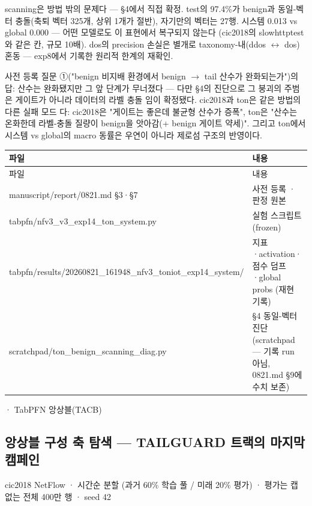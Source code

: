scanning은 방법 밖의 문제다 — §4에서 직접 확정. test의 97.4\%가 benign과 동일-벡터 충돌(축퇴 벡터 325개, 상위 1개가 절반), 자기만의 벡터는 27행. 시스템 0.013 vs global 0.000 — 어떤 모델로도 이 표현에서 복구되지 않는다 (cic2018의 slowhttptest와 같은 칸, 규모 10배). dos의 precision 손실은 별개로 taxonomy-내(ddos \ensuremath{\leftrightarrow} dos) 혼동 — exp8에서 기록한 원리적 한계의 재확인.

사전 등록 질문 ①("benign 비지배 환경에서 benign \ensuremath{\rightarrow} tail 산수가 완화되는가")의 답: 산수는 완화됐지만 그 앞 단계가 무너졌다 — 다만 §4의 진단으로 그 붕괴의 주범은 게이트가 아니라 데이터의 라벨 충돌 임이 확정됐다. cic2018과 ton은 같은 방법의 다른 실패 모드 다: cic2018은 "게이트는 좋은데 불균형 산수가 증폭", ton은 "산수는 온화한데 라벨-충돌 질량이 benign을 앗아감(+\allowbreak{} benign 게이트 약세)". 그리고 ton에서 시스템 vs global의 macro 동률은 우연이 아니라 제로섬 구조의 반영이다.

\begingroup
\footnotesize
\begin{longtable}{>{\raggedright\arraybackslash}p{}>{\raggedright\arraybackslash}p{}}
\toprule
파일 & 내용 \\ \midrule
\endfirsthead
파일 & 내용 \\ \midrule
\endhead
{}manuscript/\allowbreak{}report/\allowbreak{}0821.md §3·§7 & 사전 등록 · 판정 원본 \\
{}tabpfn/\allowbreak{}nfv3\_\allowbreak{}v3\_\allowbreak{}exp14\_\allowbreak{}ton\_\allowbreak{}system.py & 실험 스크립트 (frozen) \\
{}tabpfn/\allowbreak{}results/\allowbreak{}20260821\_\allowbreak{}161948\_\allowbreak{}nfv3\_\allowbreak{}toniot\_\allowbreak{}exp14\_\allowbreak{}system/\allowbreak{} & 지표·activation·점수 덤프·global probs (재현 기록) \\
{}scratchpad/\allowbreak{}ton\_\allowbreak{}benign\_\allowbreak{}scanning\_\allowbreak{}diag.py & §4 동일-벡터 진단 (scratchpad — 기록 run 아님, 0821.md §9에 수치 보존) \\
\bottomrule
\end{longtable}
 · TabPFN 앙상블(TACB)

\subsection*{앙상블 구성 축 탐색 — TAILGUARD 트랙의 마지막 캠페인}
cic2018 NetFlow · 시간순 분할 (과거 60\% 학습 풀 /\allowbreak{} 미래 20\% 평가) · 평가는 캡 없는 전체 400만 행 · seed 42

